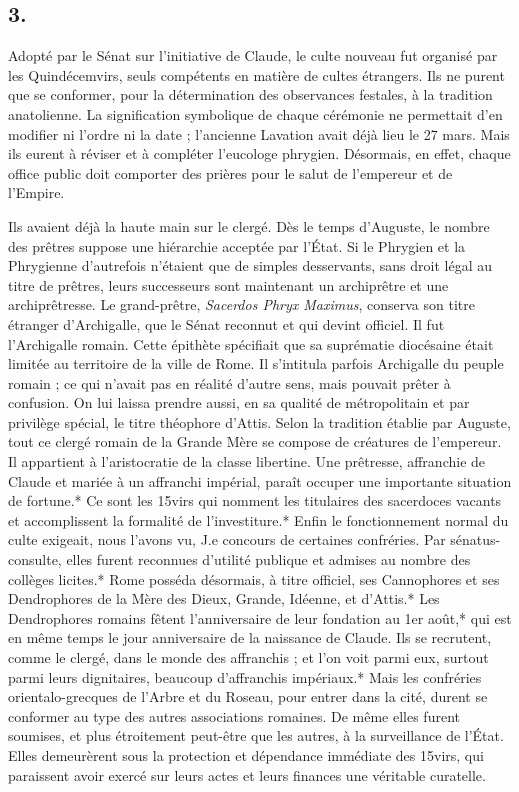 \documentclass[a4paper, 11pt, oneside, polutonikogreek, french]{article}
\begin{document}
\subsection{3.}

Adopté par le Sénat sur l'initiative de Claude, le culte nouveau fut organisé par les Quindécemvirs, seuls compétents en matière de cultes étrangers. Ils ne purent que se conformer, pour la détermination des observances festales, à la tradition anatolienne. La signification symbolique de chaque cérémonie ne permettait d'en modifier ni l'ordre ni la date ; l'ancienne Lavation avait déjà lieu le 27 mars. Mais ils eurent à réviser et à compléter l'eucologe phrygien. Désormais, en effet, chaque office public doit comporter des prières pour le salut de l'empereur et de l'Empire.

Ils avaient déjà la haute main sur le clergé. Dès le temps d'Auguste, le nombre des prêtres suppose une hiérarchie acceptée par l'État. Si le Phrygien et la Phrygienne d'autrefois n'étaient que de simples desservants, sans droit légal au titre de prêtres, leurs successeurs sont maintenant un archiprêtre et une archiprêtresse. Le grand-prêtre, \emph{Sacerdos Phryx Maximus}, conserva son titre étranger d'Archigalle, que le Sénat reconnut et qui devint officiel. Il fut l'Archigalle romain. Cette épithète spécifiait que sa suprématie diocésaine était limitée au territoire de la ville de Rome. Il s'intitula parfois Archigalle du peuple romain ; ce qui n'avait pas en réalité d'autre sens, mais pouvait prêter à confusion. On lui laissa prendre aussi, en sa qualité de métropolitain et par privilège spécial, le titre théophore d'Attis. Selon la tradition établie par Auguste, tout ce clergé romain de la Grande Mère se compose de créatures de l'empereur. Il appartient à l'aristocratie de la classe libertine. Une prêtresse, affranchie de Claude et mariée à un affranchi impérial, paraît occuper une importante situation de fortune.* Ce sont les 15virs qui nomment les titulaires des sacerdoces vacants et accomplissent la formalité de l'investiture.* Enfin le fonctionnement normal du culte exigeait, nous l'avons vu, J.e concours de certaines confréries. Par sénatus-consulte, elles furent reconnues d'utilité publique et admises au nombre des collèges licites.* Rome posséda désormais, à titre officiel, ses Cannophores et ses Dendrophores de la Mère des Dieux, Grande, Idéenne, et d'Attis.* Les Dendrophores romains fêtent l'anniversaire de leur fondation au 1er août,* qui est en même temps le jour anniversaire de la naissance de Claude. Ils se recrutent, comme le clergé, dans le monde des affranchis ; et l'on voit parmi eux, surtout parmi leurs dignitaires, beaucoup d'affranchis impériaux.* Mais les confréries orientalo-grecques de l'Arbre et du Roseau, pour entrer dans la cité, durent se conformer au type des autres associations romaines. De même elles furent soumises, et plus étroitement peut-être que les autres, à la surveillance de l'État. Elles demeurèrent sous la protection et dépendance immédiate des 15virs, qui paraissent avoir exercé sur leurs actes et leurs finances une véritable curatelle.
\end{document}
